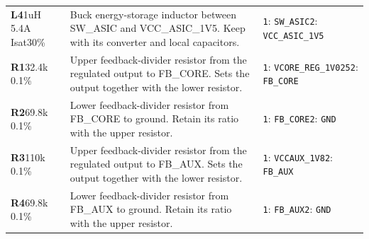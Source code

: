 \documentclass[11pt,a4paper]{article}
\begin{document}
\begin{longtable}{@{}P{27mm}P{84mm}P{57mm}@{}}
\textbf{L4}\newline 1uH 5.4A Isat30\% & Buck energy-storage inductor between SW\_ASIC and VCC\_ASIC\_1V5. Keep with its converter and local capacitors. & \nolinkurl{1}: \nolinkurl{SW_ASIC}\newline \nolinkurl{2}: \nolinkurl{VCC_ASIC_1V5} \\
\textbf{R1}\newline 32.4k 0.1\% & Upper feedback-divider resistor from the regulated output to FB\_CORE. Sets the output together with the lower resistor. & \nolinkurl{1}: \nolinkurl{VCORE_REG_1V025}\newline \nolinkurl{2}: \nolinkurl{FB_CORE} \\
\textbf{R2}\newline 69.8k 0.1\% & Lower feedback-divider resistor from FB\_CORE to ground. Retain its ratio with the upper resistor. & \nolinkurl{1}: \nolinkurl{FB_CORE}\newline \nolinkurl{2}: \nolinkurl{GND} \\
\textbf{R3}\newline 110k 0.1\% & Upper feedback-divider resistor from the regulated output to FB\_AUX. Sets the output together with the lower resistor. & \nolinkurl{1}: \nolinkurl{VCCAUX_1V8}\newline \nolinkurl{2}: \nolinkurl{FB_AUX} \\
\textbf{R4}\newline 69.8k 0.1\% & Lower feedback-divider resistor from FB\_AUX to ground. Retain its ratio with the upper resistor. & \nolinkurl{1}: \nolinkurl{FB_AUX}\newline \nolinkurl{2}: \nolinkurl{GND} \\

\end{longtable}
\end{document}
